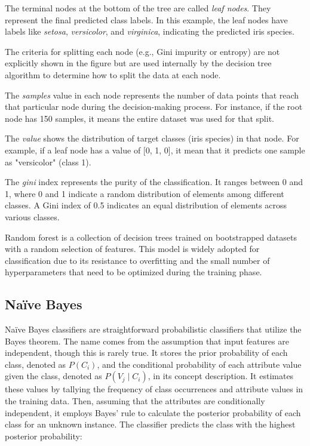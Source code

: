 The terminal nodes at the bottom of the tree are called \textit{leaf nodes}. They represent the final predicted class labels. In this example, the leaf nodes have labels like \textit{setosa}, \textit{versicolor}, and \textit{virginica}, indicating the predicted iris species.

The criteria for splitting each node (e.g., Gini impurity or entropy) are not explicitly shown in the figure but are used internally by the decision tree algorithm to determine how to split the data at each node.

The \textit{samples} value in each node represents the number of data points that reach that particular node during the decision-making process. For instance, if the root node has 150 samples, it means the entire dataset was used for that split.

The \textit{value} shows the distribution of target classes (iris species) in that node. For example, if a leaf node has a value of [0, 1, 0], it mean that it predicts one sample as "versicolor" (class 1).

The \textit{gini} index represents the purity of the classification. It ranges between 0 and 1, where 0 and 1 indicate a random distribution of elements among different classes. A Gini index of 0.5 indicates an equal distribution of elements across various classes.

Random forest \cite{L_Breiman2001} is a collection of decision trees trained on bootstrapped datasets with a random selection of features. This model is widely adopted for classification due to its resistance to overfitting \cite{OverfittingWebb} and the small number of hyperparameters that need to be optimized during the training phase.



\subsection{Naïve Bayes} %
\label{sub: Naive_Bayes}

Naïve Bayes classifiers \cite{I_H_Witten2011} are straightforward probabilistic classifiers that utilize the Bayes theorem. The name comes from the assumption that input features are independent, though this is rarely true. It stores the prior probability of each class, denoted as $P(C_i)$, and the conditional probability of each attribute value given the class, denoted as $P(V_j \mid C_i)$, in its concept description. It estimates these values by tallying the frequency of class occurrences and attribute values in the training data. Then, assuming that the attributes are conditionally independent, it employs Bayes' rule to calculate the posterior probability of each class for an unknown instance. The classifier predicts the class with the highest posterior probability:

